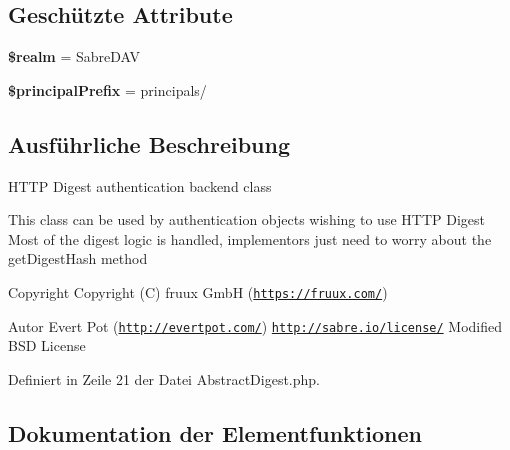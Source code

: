 \subsection*{Geschützte Attribute}
\begin{DoxyCompactItemize}
\item 
\mbox{\label{class_sabre_1_1_d_a_v_1_1_auth_1_1_backend_1_1_abstract_digest_a6c59e40acf0894f17ae8818d4e59d1ff}} 
{\bfseries \$realm} = \textquotesingle{}Sabre\+D\+AV\textquotesingle{}
\item 
\mbox{\label{class_sabre_1_1_d_a_v_1_1_auth_1_1_backend_1_1_abstract_digest_abcb773e437398fb31a5b6991016ac170}} 
{\bfseries \$principal\+Prefix} = \textquotesingle{}principals/\textquotesingle{}
\end{DoxyCompactItemize}


\subsection{Ausführliche Beschreibung}
H\+T\+TP Digest authentication backend class

This class can be used by authentication objects wishing to use H\+T\+TP Digest Most of the digest logic is handled, implementors just need to worry about the get\+Digest\+Hash method

\begin{DoxyCopyright}{Copyright}
Copyright (C) fruux GmbH (\href{https://fruux.com/}{\tt https\+://fruux.\+com/}) 
\end{DoxyCopyright}
\begin{DoxyAuthor}{Autor}
Evert Pot (\href{http://evertpot.com/}{\tt http\+://evertpot.\+com/})  \href{http://sabre.io/license/}{\tt http\+://sabre.\+io/license/} Modified B\+SD License 
\end{DoxyAuthor}


Definiert in Zeile 21 der Datei Abstract\+Digest.\+php.



\subsection{Dokumentation der Elementfunktionen}
\mbox{\label{class_sabre_1_1_d_a_v_1_1_auth_1_1_backend_1_1_abstract_digest_abc8dac3b8303fda87fdd485c74a40662}} 
